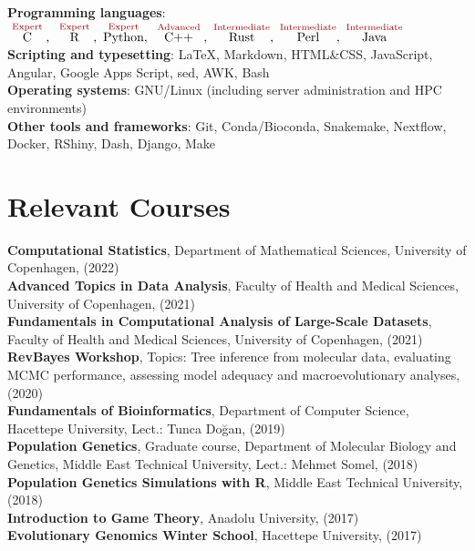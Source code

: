 \documentclass[letterpaper,10.5pt]{article}
\begin{document}
\textbf{Programming languages}:
$\overset{\textcolor{isored}{\text{   Expert   }}}{\text{C}},\ \overset{\textcolor{isored}{\text{   Expert   }}}{\text{R}},\
\overset{\textcolor{isored}{\text{  Expert  }}}{\text{Python}},\ \overset{\textcolor{isored}{\text{  Advanced  }}}{\text{C++}},\
\overset{\textcolor{isored}{\text{Intermediate}}}{\text{Rust}},\
\overset{\textcolor{isored}{\text{Intermediate}}}{\text{Perl}},\  
\overset{\textcolor{isored}{\text{Intermediate}}}{\text{Java}}$ \\
\smallskip
\textbf{Scripting and typesetting}: \LaTeX, Markdown, HTML\&CSS, JavaScript, Angular, Google Apps Script, sed, AWK, Bash \\
\smallskip
\textbf{Operating systems}: GNU/Linux (including server administration and HPC environments) \\
\smallskip
\textbf{Other tools and frameworks}: Git,  Conda/Bioconda, Snakemake, Nextflow, Docker, RShiny, Dash, Django, Make \smallskip


\section{Relevant Courses}

\textbf{Computational Statistics}, Department of Mathematical Sciences, University of Copenhagen, (2022) \\
\textbf{Advanced Topics in Data Analysis}, Faculty of Health and Medical Sciences, University of Copenhagen, (2021) \\
\textbf{Fundamentals in Computational Analysis of Large-Scale Datasets}, Faculty of Health and Medical Sciences, University of Copenhagen, (2021) \\
\textbf{RevBayes Workshop}, Topics: Tree inference from molecular data, evaluating MCMC performance, assessing model adequacy and macroevolutionary analyses, (2020) \\
\textbf{Fundamentals of Bioinformatics}, Department of Computer Science, Hacettepe University, Lect.: Tunca Do\u{g}an, (2019) \\
\textbf{Population Genetics}, Graduate course, Department of Molecular Biology and Genetics, Middle East Technical University, Lect.: Mehmet Somel, (2018) \\
\textbf{Population Genetics Simulations with R}, Middle East Technical University, (2018) \\
\textbf{Introduction to Game Theory}, Anadolu University, (2017) \\
\textbf{Evolutionary Genomics Winter School}, Hacettepe University, (2017) \\
\end{document}
